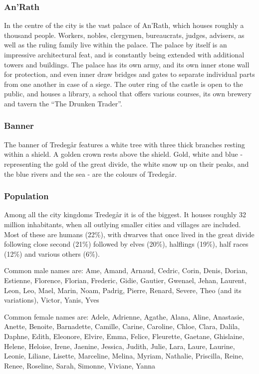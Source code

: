 \subsubsection{An'Rath}
\label{sec:AnRath}

In the centre of the city is the vast palace of An'Rath, which houses roughly
a thousand people. Workers, nobles, clergymen, bureaucrats, judges, advisers,
as well as the ruling family live within the palace. The palace by itself is
an impressive architectural feat, and is constantly being extended with
additional towers and buildings. The palace has its own army, and its own
inner stone wall for protection, and even inner draw bridges and gates to
separate individual parts from one another in case of a siege. The outer ring
of the castle is open to the public, and houses a library, a school that
offers various courses, its own brewery and tavern the ``The Drunken Trader''.

\subsubsection{Banner}

The banner of Tredegår features a white tree with three thick branches resting
within a shield. A golden crown rests above the shield. Gold, white and blue -
representing the gold of the great divide, the white snow up on their peaks,
and the blue rivers and the sea - are the colours of Tredegår.

\subsubsection{Population}

Among all the city kingdoms Tredegår it is of the biggest. It houses roughly
32 million inhabitants, when all outlying smaller cities and villages are
included. Most of these are humans (22\%), with dwarves that once lived in the
great divide following close second (21\%) followed by elves (20\%), halflings
(19\%), half races (12\%) and various others (6\%).

Common male names are: Ame, Amand, Arnaud, Cedric, Corin, Denis, Dorian,
Estienne, Florence, Florian, Frederic, Gidie, Gautier, Gwenael, Jehan, Laurent,
Leon, Leo, Mael, Marin, Noam, Padrig, Pierre, Renard, Severe, Theo (and its
variations), Victor, Yanis, Yves

Common female names are: Adele, Adrienne, Agathe, Alana, Aline, Anastasie,
Anette, Benoite, Barnadette, Camille, Carine, Caroline, Chloe, Clara, Dalila,
Daphne, Edith, Eleonore, Elvire, Emma, Felice, Fleurette, Gaetane, Ghislaine,
Helene, Heloise, Irene, Jaenine, Jessica, Judith, Julie, Lara, Laure, Laurine,
Leonie, Liliane, Lisette, Marceline, Melina, Myriam, Nathalie, Priscilla, Reine,
Renee, Roseline, Sarah, Simonne, Viviane, Yanna

